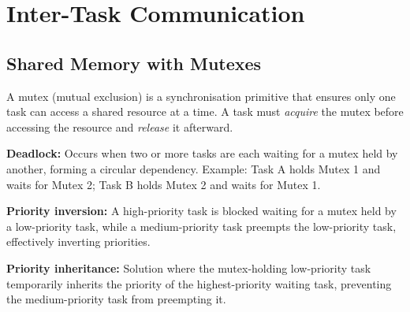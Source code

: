 \section{Inter-Task Communication}
\label{sec:mt:ipc}

\subsection{Shared Memory with Mutexes}

\begin{definition}[Mutex]
A mutex (mutual exclusion) is a synchronisation primitive that ensures only one task can access a shared resource at a time. A task must \emph{acquire} the mutex before accessing the resource and \emph{release} it afterward.
\end{definition}

\textbf{Deadlock:} Occurs when two or more tasks are each waiting for a mutex held by another, forming a circular dependency. Example: Task A holds Mutex 1 and waits for Mutex 2; Task B holds Mutex 2 and waits for Mutex 1.

\textbf{Priority inversion:} A high-priority task is blocked waiting for a mutex held by a low-priority task, while a medium-priority task preempts the low-priority task, effectively inverting priorities.

\textbf{Priority inheritance:} Solution where the mutex-holding low-priority task temporarily inherits the priority of the highest-priority waiting task, preventing the medium-priority task from preempting it.


